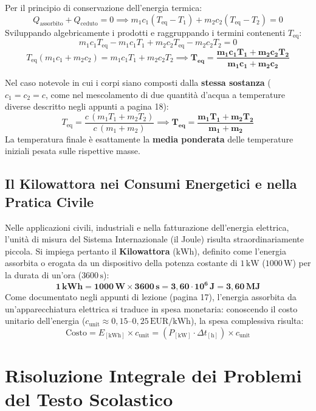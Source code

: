 \documentclass[11pt,a4paper,oneside]{report}
\begin{document}
Per il principio di conservazione dell'energia termica:
\[
Q_{\text{assorbito}} + Q_{\text{ceduto}} = 0 \implies m_1 c_1 (T_{\text{eq}} - T_1) + m_2 c_2 (T_{\text{eq}} - T_2) = 0
\]
Sviluppando algebricamente i prodotti e raggruppando i termini contenenti $T_{\text{eq}}$:
\[
m_1 c_1 T_{\text{eq}} - m_1 c_1 T_1 + m_2 c_2 T_{\text{eq}} - m_2 c_2 T_2 = 0
\]
\[
T_{\text{eq}} (m_1 c_1 + m_2 c_2) = m_1 c_1 T_1 + m_2 c_2 T_2 \implies \mathbf{T_{\text{eq}} = \frac{m_1 c_1 T_1 + m_2 c_2 T_2}{m_1 c_1 + m_2 c_2}}
\]

Nel caso notevole in cui i corpi siano composti dalla \textbf{stessa sostanza} ($c_1 = c_2 = c$, come nel mescolamento di due quantit\`a d'acqua a temperature diverse descritto negli appunti a pagina 18):
\[
T_{\text{eq}} = \frac{c \, (m_1 T_1 + m_2 T_2)}{c \, (m_1 + m_2)} \implies \mathbf{T_{\text{eq}} = \frac{m_1 T_1 + m_2 T_2}{m_1 + m_2}}
\]
La temperatura finale \`e esattamente la \textbf{media ponderata} delle temperature iniziali pesata sulle rispettive masse.

\section{Il Kilowattora nei Consumi Energetici e nella Pratica Civile}
Nelle applicazioni civili, industriali e nella fatturazione dell'energia elettrica, l'unit\`a di misura del Sistema Internazionale (il Joule) risulta straordinariamente piccola. Si impiega pertanto il \textbf{Kilowattora} ($\text{kWh}$), definito come l'energia assorbita o erogata da un dispositivo della potenza costante di $1\,\text{kW}$ ($1000\,\text{W}$) per la durata di un'ora ($3600\,\text{s}$):
\[
\mathbf{1\,\text{kWh} = 1000\,\text{W} \times 3600\,\text{s} = 3{,}60 \cdot 10^6\,\text{J} = 3{,}60\,\text{MJ}}
\]
Come documentato negli appunti di lezione (pagina 17), l'energia assorbita da un'apparecchiatura elettrica si traduce in spesa monetaria: conoscendo il costo unitario dell'energia ($c_{\text{unit}} \approx 0{,}15\text{--}0{,}25\,\text{EUR/kWh}$), la spesa complessiva risulta:
\[
\text{Costo} = E_{[\text{kWh}]} \times c_{\text{unit}} = (P_{[\text{kW}]} \cdot \Delta t_{[\text{h}]}) \times c_{\text{unit}}
\]
\chapter{Risoluzione Integrale dei Problemi del Testo Scolastico}
\end{document}
